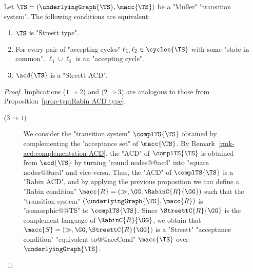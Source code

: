 \documentclass{theoretics}
\begin{document}
\begin{proposition}\label{prop-typ:Streett ACD type}
	Let $\TS = (\underlyingGraph{\TS}, \macc{\TS})$ be a "Muller" "transition system". The following conditions are equivalent:
	\begin{enumerate}
		\item $\TS$ is "Streett type".
		\item For every pair of "accepting cycles" $\ell_1, \ell_2\in \cycles{\TS}$  with some "state in common", $\ell_1\cup \ell_2$ is an "accepting cycle".\footnotemark{}
		\item $\acd{\TS}$ is a "Streett ACD". 
	\end{enumerate}
\end{proposition}
\begin{proof}
	Implications ($1 \Rightarrow 2$) and ($2 \Rightarrow 3$) are analogous to those from Proposition~\ref{prop-typ:Rabin ACD type}.
	\begin{description}		
		\item[($3 \Rightarrow 1$)] We consider the "transition system" $\complTS{\TS}$ obtained by complementing the "acceptance set" of $\macc{\TS}$. By Remark~\ref{rmk-acd:complementation-ACD}, the "ACD" of $\complTS{\TS}$ is obtained from $\acd{\TS}$ by turning "round nodes@@acd" into "square nodes@@acd" and vice-versa. Thus, the "ACD" of $\complTS{\TS}$ is a "Rabin ACD", and by applying the previous proposition we can define a "Rabin condition" $\macc{R} = (\gg, \GG, \RabinC{R}{\GG})$ such that the  "transition system" $(\underlyingGraph{\TS}, \macc{R})$ is "isomorphic@@TS" to $\complTS{\TS}$. Since $\StreettC{R}{\GG}$  is the complement language of $\RabinC{R}{\GG}$, we obtain that $\macc{S} = (\gg, \GG, \StreettC{R}{\GG})$ is a "Streett" "acceptance condition" "equivalent to@@accCond" $\macc{\TS}$ over $\underlyingGraph{\TS}$.\qedhere
	\end{description}
\end{proof} 
\end{document}
